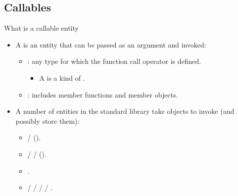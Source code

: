\subsection{Callables}

\begin{frame}[t,fragile]{What is a callable entity}
\begin{itemize}
  \item A  is an entity that can be passed as an argument and invoked:
    \begin{itemize}
      \item {}: any type 
        for which the function call operator is defined.
         \begin{itemize}
           \item A  is a kind of .
         \end{itemize}

      \item {}: includes member functions and 
            member objects.
    \end{itemize}

  \item A number of entities in the standard library take  objects
        to invoke (and possibly store them):
    \begin{itemize}
      \item {} / 
             ().
      \item {} / 
             /
             ().
      \item {}.
      \item {} /  /  /  / .
    \end{itemize}
\end{itemize}
\end{frame}
